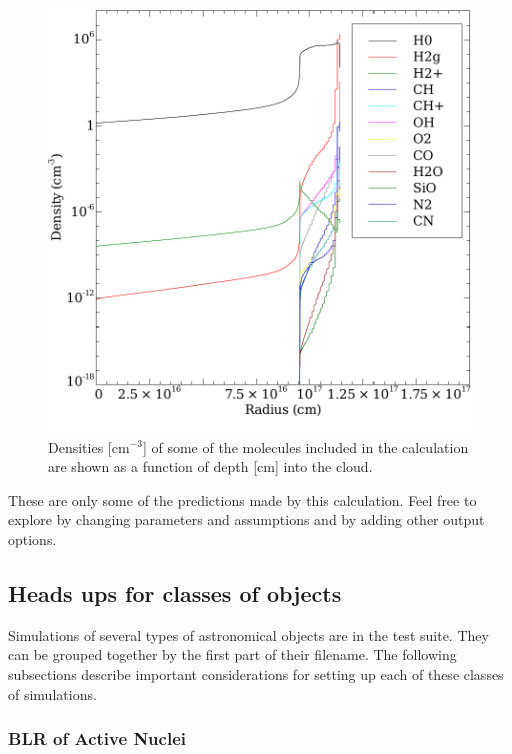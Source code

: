 \documentclass[12pt,twoside]{article}
\begin{document}
{\begin{figure}
\begin{center}
\includegraphics[clip=on,width=\columnwidth,height=0.8\textheight,keepaspectratio]{molecule_structure}
\end{center}
\caption{Densities [cm$^{-3}$] of some of the molecules included in the calculation are shown as a function of depth [cm] into the cloud.}
\label{fig:molecule_structure}
\end{figure}

These are only some of the predictions made by this calculation.
Feel free to explore by changing parameters and assumptions and by adding
other output options.

\subsection{Heads ups for classes of objects}

Simulations of several types of astronomical objects are in the test
suite.  They can be grouped together by the first part of their filename.
The following subsections describe important considerations for setting
up each of these classes of simulations.

\subsubsection{BLR of Active Nuclei}

}
\end{document}
